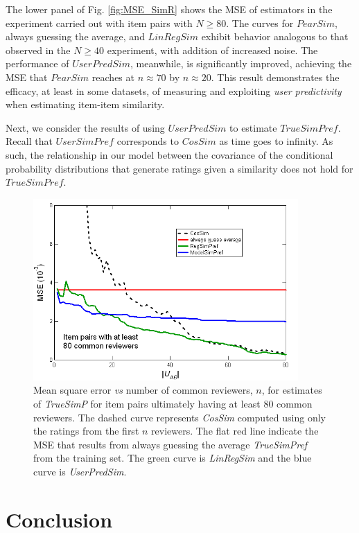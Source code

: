 \documentclass[11pt]{article}
\begin{document}
{The lower panel of Fig. \ref{fig:MSE_SimR} shows the MSE of estimators in the
experiment carried out with item pairs with $N \geq 80$. The curves for
$PearSim$, always guessing the average, and $LinRegSim$ exhibit behavior
analogous to that observed in the $N \geq 40$ experiment, with addition of
increased noise. The performance of $UserPredSim$, meanwhile, is significantly
improved, achieving the MSE that $PearSim$ reaches at $n \approx 70$ by $n
\approx 20$. This result demonstrates the efficacy, at least in some datasets,
of measuring and exploiting {\em user predictivity} when estimating item-item
similarity.

Next, we consider the results of using $UserPredSim$ to estimate $TrueSimPref$.
Recall that $UserSimPref$ corresponds to $CosSim$ as time goes to infinity. As
such, the relationship in our model between the covariance of the conditional
probability distributions that generate ratings given a similarity does not hold
for $TrueSimPref$.

\begin{figure}[!htbp]
    \centering
    \includegraphics[width=0.9\textwidth]{MSE_SimP_80.png}
	\caption{Mean square error {\em vs} number of common reviewers, $n$, for
estimates of {\em TrueSimP} for item pairs ultimately having at least 80 common
reviewers. The dashed curve represents {\em CosSim} computed using only the
ratings from the first $n$ reviewers. The flat red line indicate the MSE that
results from always guessing the average {\em TrueSimPref} from the training
set. The green curve is {\em LinRegSim} and the blue curve is {\em UserPredSim}.
}
    \label{fig:MSE_SimP}
\end{figure}

\section*{Conclusion}
}
\end{document}
